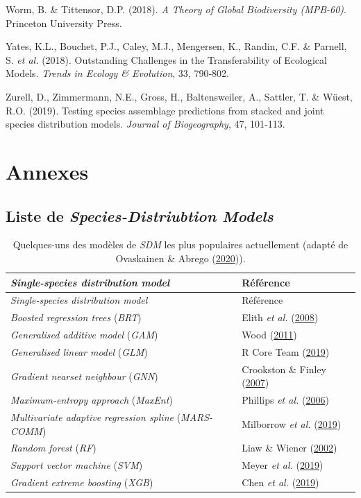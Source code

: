 \documentclass[12pt,]{article}
\newlength{\cslhangindent}
\newenvironment{cslreferences}%
  {\setlength{\parindent}{0pt}%
  \everypar{\setlength{\hangindent}{\cslhangindent}}\ignorespaces}%
  {\par}
\begin{document}
\begin{cslreferences}
\leavevmode\hypertarget{ref-Worm_2018}{}%
Worm, B. \& Tittensor, D.P. (2018). \emph{A Theory of Global
Biodiversity (MPB-60)}. Princeton University Press.

\leavevmode\hypertarget{ref-Yates_2018}{}%
Yates, K.L., Bouchet, P.J., Caley, M.J., Mengersen, K., Randin, C.F. \&
Parnell, S. \emph{et al.} (2018). Outstanding Challenges in the
Transferability of Ecological Models. \emph{Trends in Ecology \&
Evolution}, 33, 790‑802.

\leavevmode\hypertarget{ref-Zurell_2019}{}%
Zurell, D., Zimmermann, N.E., Gross, H., Baltensweiler, A., Sattler, T.
\& Wüest, R.O. (2019). Testing species assemblage predictions from
stacked and joint species distribution models. \emph{Journal of
Biogeography}, 47, 101‑113.
\end{cslreferences}

\hypertarget{annexes}{%
\section{Annexes}\label{annexes}}

\hypertarget{liste-de-species-distriubtion-models}{%
\subsection{\texorpdfstring{Liste de \emph{Species-Distriubtion
Models}}{Liste de Species-Distriubtion Models}}\label{liste-de-species-distriubtion-models}}

{\small
\begin{longtable}[]{@{}ll@{}}
\caption{Quelques-uns des modèles de \emph{SDM} les plus populaires
actuellement (adapté de Ovaskainen \& Abrego
(\protect\hyperlink{ref-Ovaskainen_2020}{2020})).
\label{tbl:sdm}}\tabularnewline
\toprule
\emph{Single-species distribution model} & Référence\tabularnewline
\midrule
\endfirsthead
\toprule
\emph{Single-species distribution model} & Référence\tabularnewline
\midrule
\endhead
\emph{Boosted regression trees} (\emph{BRT}) & Elith \emph{et al.}
(\protect\hyperlink{ref-Elith_2008}{2008})\tabularnewline
\emph{Generalised additive model} (\emph{GAM}) & Wood
(\protect\hyperlink{ref-Wood_2011}{2011})\tabularnewline
\emph{Generalised linear model} (\emph{GLM}) & R Core Team
(\protect\hyperlink{ref-RCoreTeam_2019}{2019})\tabularnewline
\emph{Gradient nearset neighbour} (\emph{GNN}) & Crookston \& Finley
(\protect\hyperlink{ref-Crookston_2007}{2007})\tabularnewline
\emph{Maximum-entropy approach} (\emph{MaxEnt}) & Phillips \emph{et al.}
(\protect\hyperlink{ref-Phillips_2006}{2006})\tabularnewline
\emph{Multivariate adaptive regression spline} (\emph{MARS-COMM}) &
Milborrow \emph{et al.}
(\protect\hyperlink{ref-Milborrow_2017}{2019})\tabularnewline
\emph{Random forest} (\emph{RF}) & Liaw \& Wiener
(\protect\hyperlink{ref-Liaw_2002}{2002})\tabularnewline
\emph{Support vector machine} (\emph{SVM}) & Meyer \emph{et al.}
(\protect\hyperlink{ref-Meyer_2019}{2019})\tabularnewline
\emph{Gradient extreme boosting} (\emph{XGB}) & Chen \emph{et al.}
(\protect\hyperlink{ref-Chen_2019}{2019})\tabularnewline
\bottomrule
\end{longtable}}\FloatBarrier
\end{document}
